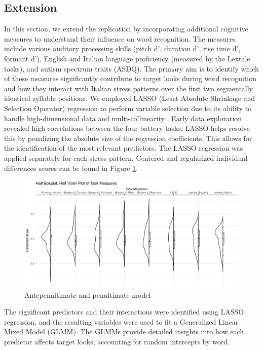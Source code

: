 \subsection{Extension}

In this section, we extend the replication by incorporating additional cognitive measures to understand their influence on word recognition. The measures include various auditory processing skills (pitch d', duration d', rise time d', formant d'), English and Italian language proficiency (measured by the Lextale tasks), and autism spectrum traits (ASDQ). The primary aim is to identify which of these measures significantly contribute to target looks during word recognition and how they interact with Italian stress patterns over the first two segmentally identical syllable positions. We employed LASSO (Least Absolute Shrinkage and Selection Operator) regression to perform variable selection due to its ability to handle high-dimensional data and multi-collinearity \citep{Zhang2020, Tibshirani1996}. Early data exploration revealed high correlations between the four battery tasks. LASSO helps resolve this by penalizing the absolute size of the regression coefficients. This allows for the identification of the most relevant predictors. The LASSO regression was applied separately for each stress pattern. Centered and regularized individual differences scores can be found in Figure \ref{fig:plot_raw_task}.


\begin{figure}[H]
  \centering
  \includegraphics[width=1\linewidth]{visuals/plot_raw_task.jpeg} %
  \caption{Antepenultimate and penultimate model}
  \label{fig:plot_raw_task}
\end{figure}


The significant predictors and their interactions were identified using LASSO regression, and the resulting variables were used to fit a Generalized Linear Mixed Model (GLMM). The GLMMs provide detailed insights into how each predictor affects target looks, accounting for random intercepts by word.


